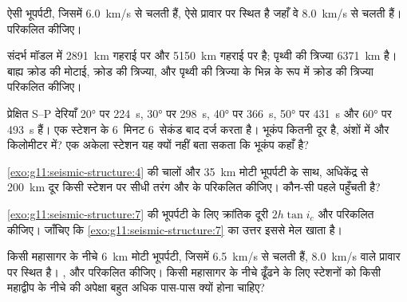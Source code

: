 \begin{exercise}[$\star$]\label{exo:g11:seismic-structure:4}
ऐसी भूपर्पटी, जिसमें  \qty{6.0}{km/s} से चलती हैं, ऐसे प्रावार पर स्थित है जहाँ
वे \qty{8.0}{km/s} से चलती हैं।  परिकलित कीजिए।
\end{exercise}

\begin{exercise}[$\star$]\label{exo:g11:seismic-structure:5}
संदर्भ मॉडल में  \qty{2891}{km} गहराई पर और
 \qty{5150}{km} गहराई पर है; पृथ्वी की त्रिज्या
\qty{6371}{km} है। बाह्य क्रोड की मोटाई, क्रोड की
त्रिज्या, और पृथ्वी की त्रिज्या के भिन्न के रूप में क्रोड की त्रिज्या परिकलित कीजिए।
\end{exercise}

\begin{exercise}[$\star\star$]\label{exo:g11:seismic-structure:6}
प्रेक्षित S--P देरियाँ \ang{20} पर \qty{224}{s}, \ang{30} पर \qty{298}{s},
\ang{40} पर \qty{366}{s}, \ang{50} पर \qty{431}{s} और
\ang{60} पर \qty{493}{s} हैं। एक स्टेशन  के 6~मिनट 6~सेकंड बाद
 दर्ज करता है। भूकंप कितनी दूर है, अंशों में और किलोमीटर में?
एक अकेला स्टेशन यह क्यों नहीं बता सकता कि भूकंप कहाँ है?
\end{exercise}

\begin{exercise}[$\star\star$]\label{exo:g11:seismic-structure:7}
\cref{exo:g11:seismic-structure:4} की चालों और \qty{35}{km} मोटी भूपर्पटी के साथ,
अधिकेंद्र से \qty{200}{km} दूर किसी स्टेशन पर सीधी तरंग और
 के  परिकलित कीजिए। कौन-सी पहले पहुँचती है?
\end{exercise}

\begin{exercise}[$\star\star$]\label{exo:g11:seismic-structure:8}
\cref{exo:g11:seismic-structure:7} की भूपर्पटी के लिए क्रांतिक
दूरी $2h\tan i_c$ और  परिकलित कीजिए। जाँचिए कि
\cref{exo:g11:seismic-structure:7} का उत्तर इससे मेल खाता है।
\end{exercise}

\begin{exercise}[$\star\star$]\label{exo:g11:seismic-structure:9}
किसी महासागर के नीचे \qty{6}{km} मोटी भूपर्पटी, जिसमें 
\qty{6.5}{km/s} से चलती हैं, \qty{8.0}{km/s} वाले प्रावार पर स्थित है। ,  और  परिकलित कीजिए। किसी महासागर के नीचे  ढूँढने के लिए
स्टेशनों को किसी महाद्वीप के नीचे की अपेक्षा बहुत अधिक पास-पास क्यों होना
चाहिए?
\end{exercise}

